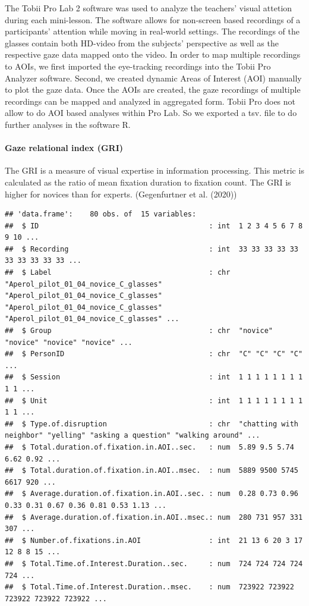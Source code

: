 \documentclass[
  english,
  man,floatsintext]{apa6}
\let\oldparagraph\paragraph
\renewcommand{\paragraph}[1]{\oldparagraph{#1}\mbox{}}
\begin{document}
The Tobii Pro Lab 2 software was used to analyze the teachers' visual attetion during each mini-lesson. The software allows for non-screen based recordings of a participants' attention while moving in real-world settings. The recordings of the glasses contain both HD-video from the subjects' perspective as well as the respective gaze data mapped onto the video. In order to map multiple recordings to AOIs, we first imported the eye-tracking recordings into the Tobii Pro Analyzer software. Second, we created dynamic Areas of Interest (AOI) manually to plot the gaze data. Once the AOIs are created, the gaze recordings of multiple recordings can be mapped and analyzed in aggregated form. Tobii Pro does not allow to do AOI based analyses within Pro Lab. So we exported a tsv. file to do further analyses in the software R.

\hypertarget{gaze-relational-index-gri}{%
\paragraph{Gaze relational index (GRI)}\label{gaze-relational-index-gri}}

The GRI is a measure of visual expertise in information processing. This metric is calculated as the ratio of mean fixation duration to fixation count. The GRI is higher for novices than for experts. (Gegenfurtner et al. (2020))

\begin{verbatim}
## 'data.frame':    80 obs. of  15 variables:
##  $ ID                                        : int  1 2 3 4 5 6 7 8 9 10 ...
##  $ Recording                                 : int  33 33 33 33 33 33 33 33 33 33 ...
##  $ Label                                     : chr  "Aperol_pilot_01_04_novice_C_glasses" "Aperol_pilot_01_04_novice_C_glasses" "Aperol_pilot_01_04_novice_C_glasses" "Aperol_pilot_01_04_novice_C_glasses" ...
##  $ Group                                     : chr  "novice" "novice" "novice" "novice" ...
##  $ PersonID                                  : chr  "C" "C" "C" "C" ...
##  $ Session                                   : int  1 1 1 1 1 1 1 1 1 1 ...
##  $ Unit                                      : int  1 1 1 1 1 1 1 1 1 1 ...
##  $ Type.of.disruption                        : chr  "chatting with neighbor" "yelling" "asking a question" "walking around" ...
##  $ Total.duration.of.fixation.in.AOI..sec.   : num  5.89 9.5 5.74 6.62 0.92 ...
##  $ Total.duration.of.fixation.in.AOI..msec.  : num  5889 9500 5745 6617 920 ...
##  $ Average.duration.of.fixation.in.AOI..sec. : num  0.28 0.73 0.96 0.33 0.31 0.67 0.36 0.81 0.53 1.13 ...
##  $ Average.duration.of.fixation.in.AOI..msec.: num  280 731 957 331 307 ...
##  $ Number.of.fixations.in.AOI                : int  21 13 6 20 3 17 12 8 8 15 ...
##  $ Total.Time.of.Interest.Duration..sec.     : num  724 724 724 724 724 ...
##  $ Total.Time.of.Interest.Duration..msec.    : num  723922 723922 723922 723922 723922 ...
\end{verbatim}
\end{document}
